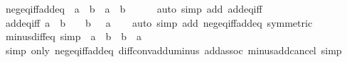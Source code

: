 \begin{isabellebody}
{\isafoldproof}%
%
\isadelimproof
\isanewline
%
\endisadelimproof
\isanewline
{}\isamarkupfalse%
\ neg{\isacharunderscore}{\kern0pt}eq{\isacharunderscore}{\kern0pt}iff{\isacharunderscore}{\kern0pt}add{\isacharunderscore}{\kern0pt}eq{\isacharunderscore}{\kern0pt}{}{\isacharcolon}{\kern0pt}\ {\isachardoublequoteopen}{\isacharminus}{\kern0pt}\ a\ {\isacharequal}{\kern0pt}\ b\ {\isasymlongleftrightarrow}\ a\ {\isacharplus}{\kern0pt}\ b\ {\isacharequal}{\kern0pt}\ {}{\isachardoublequoteclose}\isanewline
%
\isadelimproof
\ \ %
\endisadelimproof
%
\isatagproof
{}\isamarkupfalse%
\ {\isacharparenleft}{\kern0pt}auto\ simp\ add{\isacharcolon}{\kern0pt}\ add{\isacharunderscore}{\kern0pt}eq{\isacharunderscore}{\kern0pt}{}{\isacharunderscore}{\kern0pt}iff{}{\isacharparenright}{\kern0pt}%
\endisatagproof
{\isafoldproof}%
%
\isadelimproof
\isanewline
%
\endisadelimproof
\isanewline
{}\isamarkupfalse%
\ add{\isacharunderscore}{\kern0pt}eq{\isacharunderscore}{\kern0pt}{}{\isacharunderscore}{\kern0pt}iff{\isacharcolon}{\kern0pt}\ {\isachardoublequoteopen}a\ {\isacharplus}{\kern0pt}\ b\ {\isacharequal}{\kern0pt}\ {}\ {\isasymlongleftrightarrow}\ b\ {\isacharequal}{\kern0pt}\ {\isacharminus}{\kern0pt}\ a{\isachardoublequoteclose}\isanewline
%
\isadelimproof
\ \ %
\endisadelimproof
%
\isatagproof
{}\isamarkupfalse%
\ {\isacharparenleft}{\kern0pt}auto\ simp\ add{\isacharcolon}{\kern0pt}\ neg{\isacharunderscore}{\kern0pt}eq{\isacharunderscore}{\kern0pt}iff{\isacharunderscore}{\kern0pt}add{\isacharunderscore}{\kern0pt}eq{\isacharunderscore}{\kern0pt}{}\ {\isacharbrackleft}{\kern0pt}symmetric{\isacharbrackright}{\kern0pt}{\isacharparenright}{\kern0pt}%
\endisatagproof
{\isafoldproof}%
%
\isadelimproof
\isanewline
%
\endisadelimproof
\isanewline
{}\isamarkupfalse%
\ minus{\isacharunderscore}{\kern0pt}diff{\isacharunderscore}{\kern0pt}eq\ {\isacharbrackleft}{\kern0pt}simp{\isacharbrackright}{\kern0pt}{\isacharcolon}{\kern0pt}\ {\isachardoublequoteopen}{\isacharminus}{\kern0pt}\ {\isacharparenleft}{\kern0pt}a\ {\isacharminus}{\kern0pt}\ b{\isacharparenright}{\kern0pt}\ {\isacharequal}{\kern0pt}\ b\ {\isacharminus}{\kern0pt}\ a{\isachardoublequoteclose}\isanewline
%
\isadelimproof
\ \ %
\endisadelimproof
%
\isatagproof
{}\isamarkupfalse%
\ {\isacharparenleft}{\kern0pt}simp\ only{\isacharcolon}{\kern0pt}\ neg{\isacharunderscore}{\kern0pt}eq{\isacharunderscore}{\kern0pt}iff{\isacharunderscore}{\kern0pt}add{\isacharunderscore}{\kern0pt}eq{\isacharunderscore}{\kern0pt}{}\ diff{\isacharunderscore}{\kern0pt}conv{\isacharunderscore}{\kern0pt}add{\isacharunderscore}{\kern0pt}uminus\ add{\isachardot}{\kern0pt}assoc\ minus{\isacharunderscore}{\kern0pt}add{\isacharunderscore}{\kern0pt}cancel{\isacharparenright}{\kern0pt}\ simp%

\end{isabellebody}
